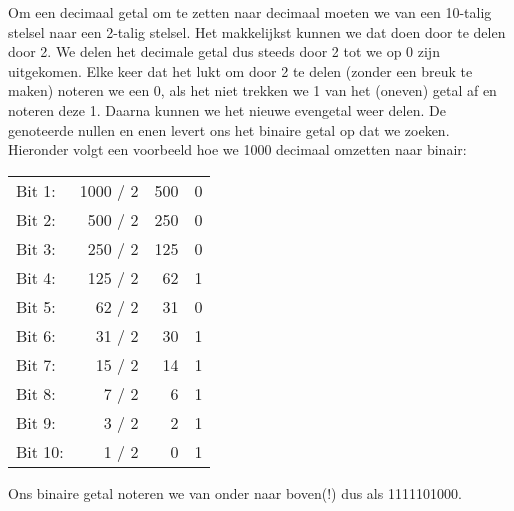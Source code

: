 Om een decimaal getal om te zetten naar decimaal moeten we van een 10-talig stelsel naar een 2-talig stelsel. Het makkelijkst kunnen we dat doen door te delen door 2. We delen het decimale getal dus steeds door 2 tot we op 0 zijn uitgekomen. Elke keer dat het lukt om door 2 te delen (zonder een breuk te maken) noteren we een 0, als het niet trekken we 1 van het (oneven) getal af en noteren deze 1. Daarna kunnen we het nieuwe evengetal weer delen. De genoteerde nullen en enen levert ons het binaire getal op dat we zoeken. Hieronder volgt een voorbeeld hoe we 1000 decimaal omzetten naar binair:

\begin{tabular} { l r r c }
Bit 1: & 1000 / 2 & 500 & 0 \\
Bit 2: & 500 / 2 & 250 & 0 \\
Bit 3: & 250 / 2 & 125 & 0 \\
Bit 4: & 125 / 2 & 62 & 1 \\
Bit 5: & 62 / 2 & 31 & 0 \\
Bit 6: & 31 / 2 & 30 & 1 \\
Bit 7: & 15 / 2 & 14 & 1 \\
Bit 8: & 7 / 2 & 6 & 1 \\
Bit 9: & 3 / 2 & 2 & 1 \\
Bit 10: & 1 / 2 & 0 & 1 \\
\end{tabular}

Ons binaire getal noteren we van onder naar boven(!) dus als 1111101000.

